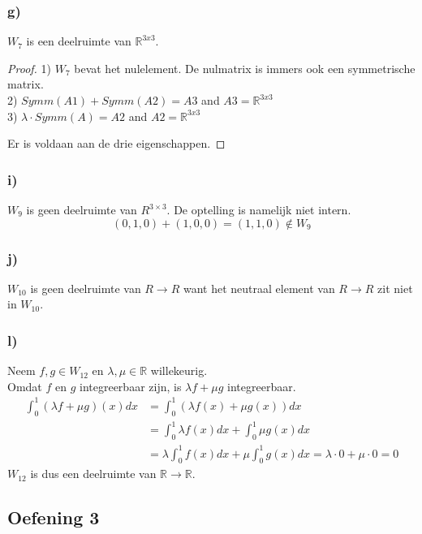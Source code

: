 \documentclass[lineaire_algebra_oplossingen.tex]{subfiles}
\begin{document}
\subsubsection*{g)}
$W_7$ is een deelruimte van $\mathbb{R}^{3x3}$.\\
\begin{proof} 

1) $W_7$ bevat het nulelement. De nulmatrix is immers ook een symmetrische matrix. \\
2) $ Symm(A1) + Symm(A2) = A3 $
	and $A3 = \mathbb{R}^{3x3}$ \\
3) $ \lambda \cdot Symm(A) = A2 $
	and $ A2 = \mathbb{R}^{3x3}$

Er is voldaan aan de drie eigenschappen.

\end{proof}


\subsubsection*{i)}
$W_9$ is geen deelruimte van $R^{3\times 3}$. De optelling is namelijk niet intern.
\[
(0,1,0) + (1,0,0) = (1,1,0) \not \in W_9
\]

\subsubsection*{j)}
$W_{10}$ is geen deelruimte van $R\rightarrow R$ want het neutraal element van $R\rightarrow R$  zit niet in $W_{10}$.
\subsubsection*{l)}
Neem $f, g \in W_{12}$ en $\lambda, \mu \in \mathbb{R}$ willekeurig.\\
Omdat $f$ en $g$ integreerbaar zijn, is $\lambda f + \mu g$ integreerbaar.
\begin{align*}
  \int^1_0 (\lambda f + \mu g)(x)dx &= \int^1_0(\lambda f(x) + \mu g(x))dx\\
  &= \int^1_0 \lambda f(x)dx + \int^1_0 \mu g(x)dx\\
  &= \lambda \int^1_0 f(x)dx + \mu \int^1_0 g(x)dx = \lambda \cdot 0 + \mu \cdot 0 = 0
\end{align*}
$W_{12}$ is dus een deelruimte van $\mathbb{R} \rightarrow \mathbb{R}$.



\subsection{Oefening 3}
\end{document}
